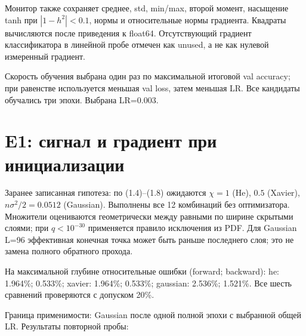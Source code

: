 Монитор также сохраняет среднее, std, min/max, второй момент, насыщение tanh при $|1-h^2|<0.1$, нормы и относительные нормы градиента. Квадраты вычисляются после приведения к float64. Отсутствующий градиент классификатора в линейной пробе отмечен как unused, а не как нулевой измеренный градиент.


Скорость обучения выбрана один раз по максимальной итоговой val accuracy; при равенстве используется меньшая val loss, затем меньшая LR. Все кандидаты обучались три эпохи. Выбрана LR=0.003.



\begin{table}[H]\centering\small\setlength{\tabcolsep}{4pt}
\caption{Выбор единой скорости обучения по validation, три эпохи.}
\FitTable{}
\end{table}



\section{E1: сигнал и градиент при инициализации}

Заранее записанная гипотеза: по (1.4)--(1.8) ожидаются $\chi=1$ (He), $0.5$ (Xavier), $n\sigma^2/2=0.0512$ (Gaussian). Выполнены все 12 комбинаций без оптимизатора. Множители оцениваются геометрически между равными по ширине скрытыми слоями; при $q<10^{-30}$ применяется правило исключения из PDF. Для Gaussian L=96 эффективная конечная точка может быть раньше последнего слоя; это не замена полного обратного прохода.

\begin{table}[H]\centering\small\setlength{\tabcolsep}{4pt}
\caption{Предсказанный и измеренные множители при инициализации.}
\FitTable{}
\end{table}

На максимальной глубине относительные ошибки (forward; backward): he: 1.964\%; 0.533\%; xavier: 1.964\%; 0.533\%; gaussian: 2.536\%; 1.521\%. Все шесть сравнений проверяются с допуском 20\%.

Граница применимости: Gaussian после одной полной эпохи с выбранной общей LR. Результаты повторной пробы:

\begin{table}[H]\centering\small\setlength{\tabcolsep}{4pt}
\caption{Повторная проба Gaussian после одной эпохи обучения.}
\FitTable{}
\end{table}

